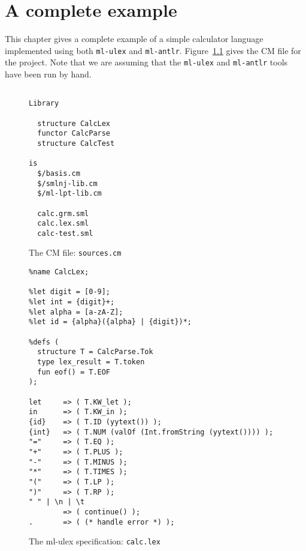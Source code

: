 %
\chapter{A complete example}
\label{ch:example}

This chapter gives a complete example of a simple calculator
language implemented using both \texttt{ml-ulex} and \texttt{ml-antlr}.
Figure~\ref{fig:calc-sources} gives the CM file for the project.
Note that we are assuming that the \texttt{ml-ulex} and \texttt{ml-antlr}
tools have been run by hand.
\begin{figure}[h]
\begin{verbatim}

Library

  structure CalcLex
  functor CalcParse
  structure CalcTest

is
  $/basis.cm
  $/smlnj-lib.cm
  $/ml-lpt-lib.cm

  calc.grm.sml
  calc.lex.sml
  calc-test.sml

\end{verbatim}
\caption{The CM file: {\tt sources.cm}}
\label{fig:calc-sources}
\end{figure}

\begin{figure}
\begin{verbatim}
%name CalcLex;

%let digit = [0-9];
%let int = {digit}+;
%let alpha = [a-zA-Z];
%let id = {alpha}({alpha} | {digit})*;

%defs (
  structure T = CalcParse.Tok
  type lex_result = T.token
  fun eof() = T.EOF
);

let     => ( T.KW_let );
in      => ( T.KW_in );
{id}    => ( T.ID (yytext()) );
{int}   => ( T.NUM (valOf (Int.fromString (yytext()))) );
"="     => ( T.EQ );
"+"     => ( T.PLUS );
"-"     => ( T.MINUS );
"*"     => ( T.TIMES );
"("     => ( T.LP );
")"     => ( T.RP );
" " | \n | \t
        => ( continue() );
.       => ( (* handle error *) );
\end{verbatim}
\caption{The ml-ulex specification: {\tt calc.lex}}
\label{fig:calc-lex}
\end{figure}

